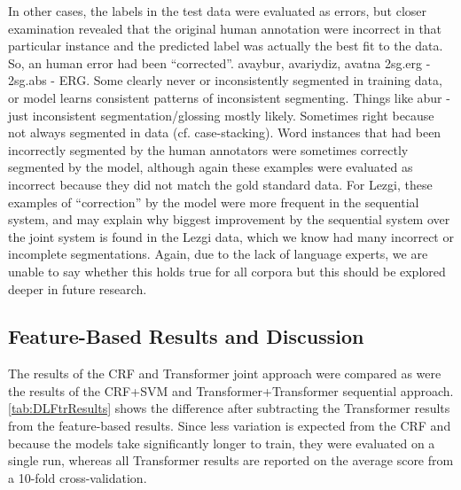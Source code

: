In other cases, the labels in the test data were evaluated as errors, but closer examination revealed that the original human annotation were incorrect in that particular instance and the predicted label was actually the best fit to the data. So, an human error had been ``corrected''. 
avaybur, avariydiz, avatna 2sg.erg - 2sg.abs - ERG.  Some clearly never or inconsistently segmented in training data, or model learns consistent patterns of inconsistent segmenting. Things like  abur -\textrangle{} just inconsistent segmentation/glossing mostly likely. Sometimes right because not always segmented in data (cf. case-stacking). 
Word instances that had been incorrectly segmented by the human annotators were sometimes correctly segmented by the model, although again these examples were evaluated as incorrect because they did not match the gold standard data. For Lezgi, these examples of ``correction'' by the model were more frequent in the sequential system, and may explain why biggest improvement by the sequential system over the joint system is found in the Lezgi data, which we know had many incorrect or incomplete segmentations.  Again, due to the lack of language experts, we are unable to say whether this holds true for all corpora but this should be explored deeper in future research.


\subsection{Feature-Based Results and Discussion}
\label{sec:sgFtrAnalysis}

The results of the CRF and Transformer joint approach were compared as were the results of the CRF+SVM and Transformer+Transformer sequential approach. \autoref{tab:DLFtrResults} shows the difference after subtracting the Transformer results from the feature-based results. Since less variation is expected from the CRF and because the models take significantly longer to train, they were evaluated on a single run, whereas all Transformer results are reported on the average score from a 10-fold cross-validation. 

